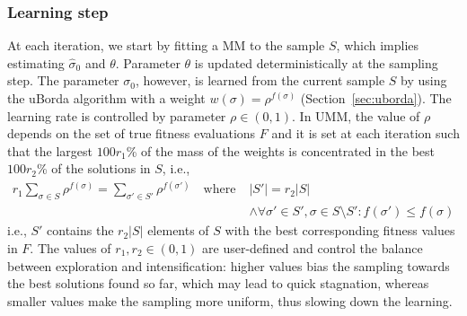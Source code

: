 \documentclass[runningheads]{llncs}
\begin{document}
\subsubsection{Learning step}
%
At each iteration, we start by fitting a MM to the sample $S$, which implies
estimating $\hat\sigma_0$ and $\theta$. Parameter $\theta$ is updated
deterministically at the sampling step.  The parameter $\sigma_0$, however, is
learned from the current sample $S$ by using the uBorda algorithm with a weight
$w(\sigma)=\rho^{f(\sigma)}$ (Section~\ref{sec:uborda}). The learning rate is
controlled by parameter $\rho \in (0,1)$. %
In UMM, the value of $\rho$ depends on the set of true fitness evaluations $F$
and it is set at each iteration such that the largest $100r_1$\% of the mass of
the weights is concentrated in the best $100r_2$\% of the solutions in $S$, i.e.,
%
\begin{equation}
  \begin{split}
  r_1 \sum_{\sigma\in S}\rho^{f(\sigma)} =  \sum_{\sigma'\in S'}\rho^{f(\sigma')} \quad\text{where}\; &|S'| = r_2|S| \\[-1.2em]
  &\land \forall \sigma'\in S', \sigma\in S\setminus S' : f(\sigma')\leq f(\sigma)
  \end{split}
\end{equation}
%
i.e., $S'$ contains the $r_2|S|$ elements of $S$ with the best corresponding fitness values in $F$. The values of $r_1, r_2 \in (0, 1)$ are user-defined and control the balance between exploration and intensification: higher values bias the sampling towards the best solutions found so far, which may lead to quick stagnation, whereas smaller values make the sampling more uniform, thus slowing down the learning.



\end{document}
